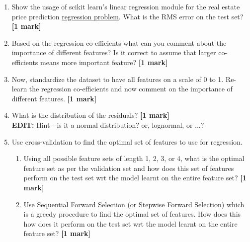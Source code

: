 \documentclass[colorlinks,linkcolor=true]{article}
\begin{document}
\item  \begin{enumerate}
	

\item Show the usage of scikit learn's linear regression module for the real estate price prediction \href{https://archive.ics.uci.edu/ml/datasets/Real+estate+valuation+data+set}{regression problem}.  What is the RMS error on the test set?  \textbf{[1 mark]}

\item Based on the regression co-efficients what can you comment about the importance of different features? Is it correct to assume that larger co-efficients means more important feature?  \textbf{[1 mark]}
\item Now, standardize the dataset to have all features on a scale of 0 to 1. Re-learn the regression co-efficients and now comment on the importance of different features.  \textbf{[1 mark]}
\item What is the distribution of the residuals?  \textbf{[1 mark]} \\
\textbf{EDIT:} Hint - is it a normal distribution? or, lognormal, or ...?
\item Use cross-validation to find the optimal set of features to use for regression. 
\begin{enumerate}
	\item Using all possible feature sets of length 1, 2, 3, or 4, what is the optimal feature set as per the validation set and how does this set of features perform on the test set wrt the model learnt on the entire feature set?  \textbf{[1 mark]}
	\item Use Sequential Forward Selection (or Stepwise Forward Selection) which is a greedy procedure to find the optimal set of features. How does this how does it perform on the test set wrt the model learnt on the entire feature set?  \textbf{[1 mark]}
\end{enumerate}
\end{enumerate}
\end{document}
